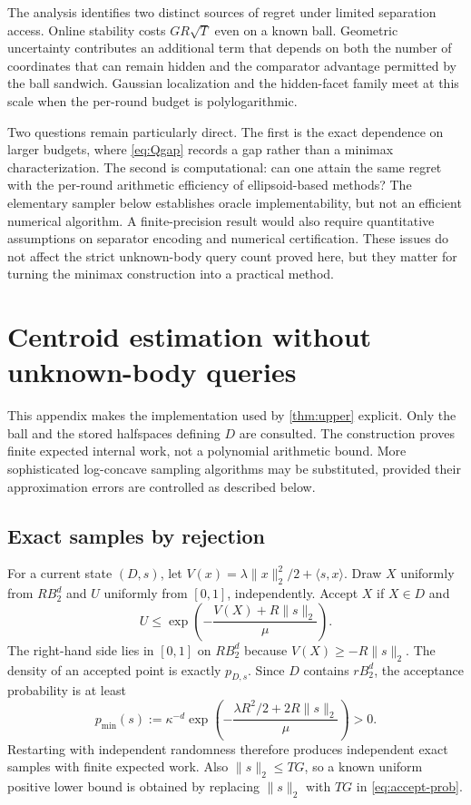 \documentclass[11pt]{article}
\newcommand{\ip}[2]{\langle #1,#2\rangle}
\newcommand{\norm}[1]{\lVert #1\rVert}
\theoremstyle{definition}
\newcounter{algorithm}
\begin{document}
The analysis identifies two distinct sources of regret under limited
separation access. Online stability costs $GR\sqrt T$ even on a known
ball. Geometric uncertainty contributes an additional term that depends on
both the number of coordinates that can remain hidden and the comparator
advantage permitted by the ball sandwich. Gaussian localization and the
hidden-facet family meet at this scale when the per-round budget is
polylogarithmic.

Two questions remain particularly direct. The first is the exact dependence
on larger budgets, where \eqref{eq:Qgap} records a gap rather than a minimax
characterization. The second is computational: can one attain the same
regret with the per-round arithmetic efficiency of ellipsoid-based
methods? The elementary sampler below establishes oracle implementability,
but not an efficient numerical algorithm. A finite-precision result would
also require quantitative assumptions on separator encoding and numerical
certification. These issues do not affect the strict unknown-body query
count proved here, but they matter for turning the minimax construction
into a practical method.

\appendix
\section{Centroid estimation without unknown-body queries}\label{app:sampling}

This appendix makes the implementation used by \cref{thm:upper} explicit.
Only the ball and the stored halfspaces defining $D$ are consulted.
The construction proves finite expected internal work, not a polynomial
arithmetic bound. More sophisticated log-concave sampling algorithms
\cite{lovaszvempala2007} may be substituted, provided their approximation
errors are controlled as described below.

\subsection{Exact samples by rejection}

For a current state $(D,s)$, let
$V(x)=\lambda\norm{x}_2^2/2+\ip{s}{x}$.
Draw $X$ uniformly from $RB_2^d$ and $U$ uniformly from $[0,1]$,
independently. Accept $X$ if $X\in D$ and
\begin{equation}\label{eq:rejection}
 U\le\exp\!\left(-\frac{V(X)+R\norm{s}_2}{\mu}\right).
\end{equation}
The right-hand side lies in $[0,1]$ on $RB_2^d$ because
$V(X)\ge-R\norm{s}_2$. The density of an accepted point is exactly
$p_{D,s}$. Since $D$ contains $rB_2^d$, the acceptance probability is at least
\begin{equation}\label{eq:accept-prob}
 p_{\min}(s):=
 \kappa^{-d}\exp\!\left(-\frac{\lambda R^2/2+2R\norm{s}_2}{\mu}\right)>0.
\end{equation}
Restarting with independent randomness therefore produces independent
exact samples with finite expected work. Also $\norm{s}_2\le TG$, so a
known uniform positive lower bound is obtained by replacing
$\norm{s}_2$ with $TG$ in \eqref{eq:accept-prob}.
\end{document}
